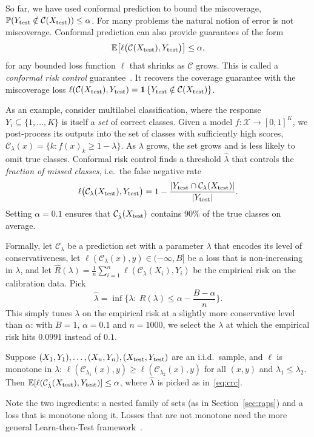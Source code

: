 \documentclass[11pt]{article}
\makeatletter
\theoremstyle{definition}
\renewcommand\subsection{\@startsection{subsection}{2}{\z@}{-3.25ex\@plus -1ex \@minus -.2ex}{1.5ex \@plus .2ex}{\normalfont\large\bfseries\color{secblue}}}
\newcommand{\C}{\mathcal{C}}
\newcommand{\X}{\mathcal{X}}
\newcommand{\lhat}{\hat{\lambda}}
\newcommand{\Xtest}{X_{\rm test}}
\newcommand{\Ytest}{Y_{\rm test}}
\newcommand{\PP}{\mathbb{P}}
\newcommand{\E}{\mathbb{E}}
\newcommand{\ind}[1]{\mathbbm{1}\left\{#1\right\}}
\renewcommand{\ind}[1]{\mathbf{1}\left\{#1\right\}}
\makeatother
\begin{document}
\subsection{Conformal Risk Control}\label{sec:crc}
So far, we have used conformal prediction to bound the miscoverage, $\PP(\Ytest\notin\C(\Xtest))\le\alpha$. For many problems the natural notion of error is not miscoverage. Conformal prediction can also provide guarantees of the form
\begin{equation}\label{eq:risk}
\E\big[\ell\big(\C(\Xtest),\Ytest\big)\big]\le\alpha,
\end{equation}
for any bounded loss function $\ell$ that shrinks as $\C$ grows. This is called a \emph{conformal risk control} guarantee~\cite{crc}. It recovers the coverage guarantee with the miscoverage loss $\ell(\C(\Xtest),\Ytest)=\ind{\Ytest\notin\C(\Xtest)}$.

As an example, consider multilabel classification, where the response $Y_i\subseteq\{1,\dots,K\}$ is itself a \emph{set} of correct classes. Given a model $f:\X\to[0,1]^K$, we post-process its outputs into the set of classes with sufficiently high scores, $\C_\lambda(x)=\{k:f(x)_k\ge1-\lambda\}$. As $\lambda$ grows, the set grows and is less likely to omit true classes. Conformal risk control finds a threshold $\lhat$ that controls the \emph{fraction of missed classes}, i.e.\ the false negative rate
\[\ell\big(\C_\lambda(\Xtest),\Ytest\big)=1-\frac{|\Ytest\cap\C_\lambda(\Xtest)|}{|\Ytest|}.\]
Setting $\alpha=0.1$ ensures that $\C_{\lhat}(\Xtest)$ contains $90\%$ of the true classes on average.

Formally, let $\C_\lambda$ be a prediction set with a parameter $\lambda$ that encodes its level of conservativeness, let $\ell(\C_\lambda(x),y)\in(-\infty,B]$ be a loss that is non-increasing in $\lambda$, and let $\widehat R(\lambda)=\frac1n\sum_{i=1}^n\ell(\C_\lambda(X_i),Y_i)$ be the empirical risk on the calibration data. Pick
\begin{equation}\label{eq:crc}
\lhat=\inf\Big\{\lambda:\ \widehat R(\lambda)\le\alpha-\frac{B-\alpha}{n}\Big\}.
\end{equation}
This simply tunes $\lambda$ on the empirical risk at a slightly more conservative level than $\alpha$: with $B=1$, $\alpha=0.1$ and $n=1000$, we select the $\lambda$ at which the empirical risk hits $0.0991$ instead of $0.1$.
\begin{theorem}\label{thm:crc}
Suppose $(X_1,Y_1),\dots,(X_n,Y_n),(\Xtest,\Ytest)$ are an i.i.d.\ sample, and $\ell$ is monotone in $\lambda$: $\ell(\C_{\lambda_1}(x),y)\ge\ell(\C_{\lambda_2}(x),y)$ for all $(x,y)$ and $\lambda_1\le\lambda_2$. Then $\E[\ell(\C_{\lhat}(\Xtest),\Ytest)]\le\alpha$, where $\lhat$ is picked as in~\eqref{eq:crc}.
\end{theorem}
Note the two ingredients: a nested family of sets (as in Section~\ref{sec:raps}) and a loss that is monotone along it. Losses that are not monotone need the more general Learn-then-Test framework~\cite{ltt}.
\end{document}
